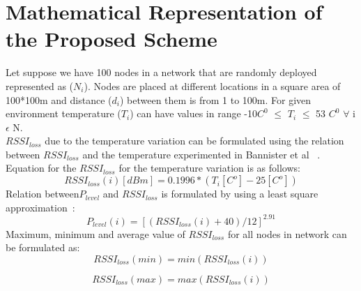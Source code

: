\documentclass[12pt, conference, compsocconf, onecolumn, draftcls]{IEEEtran}
\begin{document}
\section{Mathematical Representation of the Proposed Scheme}
Let suppose we have 100 nodes in a network that are randomly deployed represented as ($N_{i}$). Nodes are  placed at different locations in a square area of 100*100m and distance ($d_{i}$) between them is from 1 to 100m. For given environment temperature ($T_{i}$) can have values  in range
-10$C^{0}$ $\leq$ $T_{i}$ $\leq$ 53 $C^{0}$   $\forall$ i $\epsilon$ N.\\
$RSSI_{loss}$ due to the temperature variation can be formulated using the relation between $RSSI_{loss}$ and the temperature experimented in Bannister et al ~\cite{12}. Equation for the $RSSI_{loss}$ for the temperature variation is as follows:\\

\begin{equation}
RSSI_{loss}(i)[dBm]=0.1996*(T_{i}[C^{o}]-25[C^{o}])
\end{equation}
Relation between$P_{level}$ and $RSSI_{loss}$ is formulated by using a least square approximation~\cite{12}:\\
\begin{equation}
P_{level}(i)=[(RSSI_{loss}(i)+40)/12]^{2.91}
\end{equation}
Maximum, minimum and average value of $RSSI_{loss}$  for all nodes in network can be formulated as:\\
\begin{equation}
RSSI_{loss}(min)= min(RSSI_{loss}(i))
\end{equation}

\begin{equation}
RSSI_{loss}(max)= max(RSSI_{loss}(i))
\end{equation}
\end{document}
